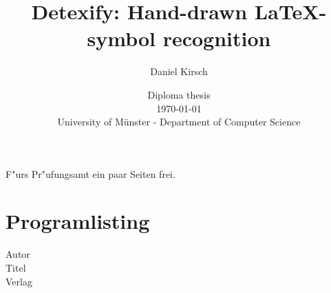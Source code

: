 \documentclass[12pt]{book}
\begin{document}
\frontmatter

\title{Detexify: Hand-drawn \LaTeX-symbol recognition}

\author{Daniel Kirsch}

\date{\vspace{10mm} Diploma thesis\\ \vspace{3mm} \today \\
\vspace{20mm}
\vspace{3mm} University of Münster - Department of Computer Science}

\maketitle


\rule{0mm}{1mm}
\newpage
\rule{0mm}{1mm}
\newpage

F"urs Pr"ufungsamt ein paar Seiten frei.

\tableofcontents



\mainmatter


\newpage

\backmatter

\appendix




\chapter{Programlisting}

\begin{tiny}




\end{tiny}

\begin{thebibliography}{90}

Autor\\
Titel\\
Verlag\\

\end{thebibliography}


\end{document}
